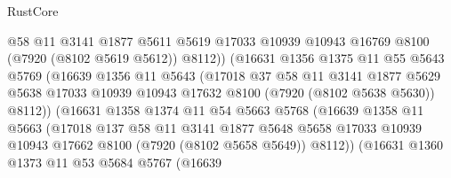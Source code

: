 \begin{lexlean}{RustCore}
\begin{coremodule}
                            @58
                            @11
                            @3141
                            @1877
                            @5611
                            @5619
                            @17033
                            @10939
                            @10943
                            @16769
                            @8100
                            (@7920 (@8102 @5619 @5612))
                            @8112))
                        (@16631
                          @1356
                          @1375
                          @11
                          @55
                          @5643
                          @5769
                          (@16639
                            @1356
                            @11
                            @5643
                            (@17018
                              @37
                              @58
                              @11
                              @3141
                              @1877
                              @5629
                              @5638
                              @17033
                              @10939
                              @10943
                              @17632
                              @8100
                              (@7920 (@8102 @5638 @5630))
                              @8112))
                          (@16631
                            @1358
                            @1374
                            @11
                            @54
                            @5663
                            @5768
                            (@16639
                              @1358
                              @11
                              @5663
                              (@17018
                                @137
                                @58
                                @11
                                @3141
                                @1877
                                @5648
                                @5658
                                @17033
                                @10939
                                @10943
                                @17662
                                @8100
                                (@7920 (@8102 @5658 @5649))
                                @8112))
                            (@16631
                              @1360
                              @1373
                              @11
                              @53
                              @5684
                              @5767
                              (@16639

\end{coremodule}
\end{lexlean}
